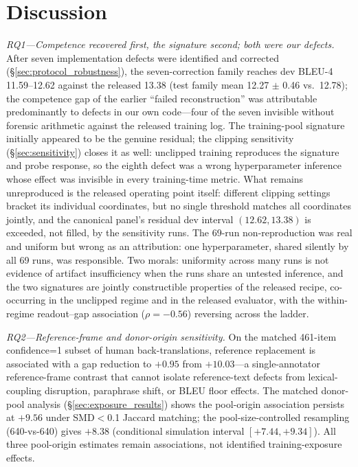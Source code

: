 \documentclass[pdflatex,sn-chicago]{sn-jnl}
\begin{document}
\section{Discussion}
\emph{RQ1---Competence recovered first, the signature second; both were our defects.} After seven implementation defects were identified and corrected (\S\ref{sec:protocol_robustness}), the seven-correction family reaches dev BLEU-4 11.59--12.62 against the released 13.38 (test family mean 12.27 $\pm$ 0.46 vs.\ 12.78); the competence gap of the earlier ``failed reconstruction'' was attributable predominantly to defects in our own code---four of the seven invisible without forensic arithmetic against the released training log. The training-pool signature initially appeared to be the genuine residual; the clipping sensitivity (\S\ref{sec:sensitivity}) closes it as well: unclipped training reproduces the signature and probe response, so the eighth defect was a wrong hyperparameter inference whose effect was invisible in every training-time metric. What remains unreproduced is the released operating point itself: different clipping settings bracket its individual coordinates, but no single threshold matches all coordinates jointly, and the canonical panel's residual dev interval $(12.62,13.38)$ is exceeded, not filled, by the sensitivity runs. The 69-run non-reproduction was real and uniform but wrong as an attribution: one hyperparameter, shared silently by all 69 runs, was responsible. Two morals: uniformity across many runs is not evidence of artifact insufficiency when the runs share an untested inference, and the two signatures are jointly constructible properties of the released recipe, co-occurring in the unclipped regime and in the released evaluator, with the within-regime readout--gap association ($\rho{=}{-}0.56$) reversing across the ladder.

\emph{RQ2---Reference-frame and donor-origin sensitivity.} On the matched 461-item confidence=1 subset of \citet{czehmann2026sacred} human back-translations, reference replacement is associated with a gap reduction to $+0.95$ from $+10.03$---a single-annotator reference-frame contrast that cannot isolate reference-text defects from lexical-coupling disruption, paraphrase shift, or BLEU floor effects. The matched donor-pool analysis (\S\ref{sec:exposure_results}) shows the pool-origin association persists at $+9.56$ under SMD$<$0.1 Jaccard matching; the pool-size-controlled resampling (640-vs-640) gives $+8.38$ (conditional simulation interval $[+7.44,+9.34]$). All three pool-origin estimates remain associations, not identified training-exposure effects.
\end{document}
